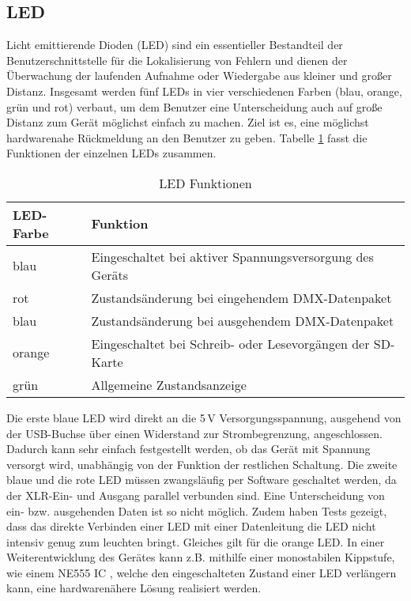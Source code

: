 
\subsection{LED}

Licht emittierende Dioden (LED) sind ein essentieller Bestandteil der Benutzerschnittstelle für die Lokalisierung von Fehlern und dienen der Überwachung der laufenden Aufnahme oder Wiedergabe aus kleiner und großer Distanz. Insgesamt werden fünf LEDs in vier verschiedenen Farben (blau, orange, grün und rot) verbaut, um dem Benutzer eine Unterscheidung auch auf große Distanz zum Gerät möglichst einfach zu machen. Ziel ist es, eine möglichst hardwarenahe Rückmeldung an den Benutzer zu geben. Tabelle \ref{table:LED} fasst die Funktionen der einzelnen LEDs zusammen. 
\begin{table}[h]
	\begin{center}
		\caption{LED Funktionen}
		\begin{tabular}{l | l}
				\textbf{LED-Farbe} & \textbf{Funktion}\\
				\hline
				blau & Eingeschaltet bei aktiver Spannungsversorgung des Geräts\\
				rot & Zustandsänderung bei eingehendem DMX-Datenpaket\\
				blau & Zustandsänderung bei ausgehendem DMX-Datenpaket\\
				orange & Eingeschaltet bei Schreib- oder Lesevorgängen der SD-Karte\\
				grün & Allgemeine Zustandsanzeige
		\end{tabular}
		\label{table:LED}
	\end{center}
\end{table}
Die erste blaue LED wird direkt an die 5\,V Versorgungsspannung, ausgehend von der USB-Buchse über einen Widerstand zur Strombegrenzung, angeschlossen. Dadurch kann sehr einfach festgestellt werden, ob das Gerät mit Spannung versorgt wird, unabhängig von der Funktion der restlichen Schaltung. Die zweite blaue und die rote LED müssen zwangsläufig per Software geschaltet werden, da der XLR-Ein- und Ausgang parallel verbunden sind. Eine Unterscheidung von ein- bzw. ausgehenden Daten ist so nicht möglich. Zudem haben Tests gezeigt, dass das direkte Verbinden einer LED mit einer Datenleitung die LED nicht intensiv genug zum leuchten bringt. Gleiches gilt für die orange LED. In einer Weiterentwicklung des Gerätes kann z.B. mithilfe einer monostabilen Kippstufe, wie einem NE555 IC \cite{NE555}, welche den eingeschalteten Zustand einer LED verlängern kann, eine hardwarenähere Lösung realisiert werden.
